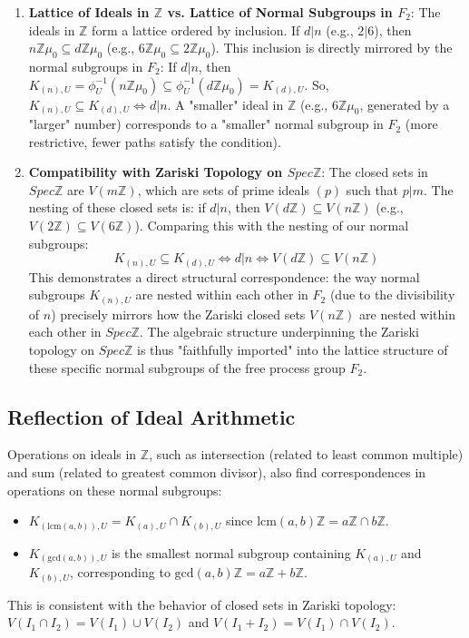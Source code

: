 \documentclass{article}[a4paper,12pt]
\begin{document}
\begin{enumerate}
    \item \textbf{Lattice of Ideals in $\mathbb{Z}$ vs. Lattice of Normal Subgroups in $F_2$}:
    The ideals in $\mathbb{Z}$ form a lattice ordered by inclusion. If $d|n$ (e.g., $2|6$), then $n\mathbb{Z}\mu_0 \subseteq d\mathbb{Z}\mu_0$ (e.g., $6\mathbb{Z}\mu_0 \subseteq 2\mathbb{Z}\mu_0$).
    This inclusion is directly mirrored by the normal subgroups in $F_2$:
    If $d|n$, then $K_{(n),U} = \phi_U^{-1}(n\mathbb{Z}\mu_0) \subseteq \phi_U^{-1}(d\mathbb{Z}\mu_0) = K_{(d),U}$.
    So, $K_{(n),U} \subseteq K_{(d),U} \iff d|n$.
    A "smaller" ideal in $\mathbb{Z}$ (e.g., $6\mathbb{Z}\mu_0$, generated by a "larger" number) corresponds to a "smaller" normal subgroup in $F_2$ (more restrictive, fewer paths satisfy the condition).

    \item \textbf{Compatibility with Zariski Topology on $Spec \mathbb{Z}$}:
    The closed sets in $Spec \mathbb{Z}$ are $V(m\mathbb{Z})$, which are sets of prime ideals $(p)$ such that $p|m$. The nesting of these closed sets is: if $d|n$, then $V(d\mathbb{Z}) \subseteq V(n\mathbb{Z})$ (e.g., $V(2\mathbb{Z}) \subseteq V(6\mathbb{Z})$).
    Comparing this with the nesting of our normal subgroups:
    \[ K_{(n),U} \subseteq K_{(d),U} \iff d|n \iff V(d\mathbb{Z}) \subseteq V(n\mathbb{Z}) \]
    This demonstrates a direct structural correspondence: the way normal subgroups $K_{(n),U}$ are nested within each other in $F_2$ (due to the divisibility of $n$) precisely mirrors how the Zariski closed sets $V(n\mathbb{Z})$ are nested within each other in $Spec \mathbb{Z}$. The algebraic structure underpinning the Zariski topology on $Spec \mathbb{Z}$ is thus "faithfully imported" into the lattice structure of these specific normal subgroups of the free process group $F_2$.
\end{enumerate}

\subsection{Reflection of Ideal Arithmetic}
Operations on ideals in $\mathbb{Z}$, such as intersection (related to least common multiple) and sum (related to greatest common divisor), also find correspondences in operations on these normal subgroups:
\begin{itemize}
    \item $K_{(\text{lcm}(a,b)),U} = K_{(a),U} \cap K_{(b),U}$ since $\text{lcm}(a,b)\mathbb{Z} = a\mathbb{Z} \cap b\mathbb{Z}$.
    \item $K_{(\text{gcd}(a,b)),U}$ is the smallest normal subgroup containing $K_{(a),U}$ and $K_{(b),U}$, corresponding to $\text{gcd}(a,b)\mathbb{Z} = a\mathbb{Z} + b\mathbb{Z}$.
\end{itemize}
This is consistent with the behavior of closed sets in Zariski topology: $V(I_1 \cap I_2) = V(I_1) \cup V(I_2)$ and $V(I_1 + I_2) = V(I_1) \cap V(I_2)$.
\end{document}
